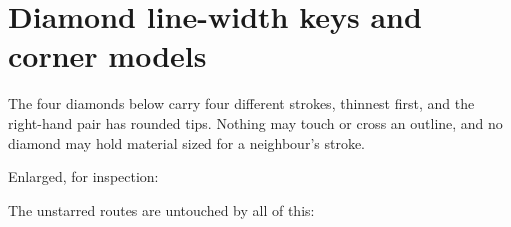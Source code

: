 \documentclass{jlreq}
\begin{document}
\section*{Diamond line-width keys and corner models}

\KKSfitshapes
{}%
%
%
%
%
%
%
%
%
%

\KKSfitsuite

\noindent The four diamonds below carry four different strokes, thinnest
first, and the right-hand pair has rounded tips.  Nothing may touch or cross
an outline, and no diamond may hold material sized for a neighbour's stroke.
\par
\medskip
{}%
\quad
{}%
\quad
{}%

\medskip
\noindent Enlarged, for inspection:\par
{\LARGE{}%
\par
{}%
}

\medskip
\noindent The unstarred routes are untouched by all of this:\par
{}
\end{document}
